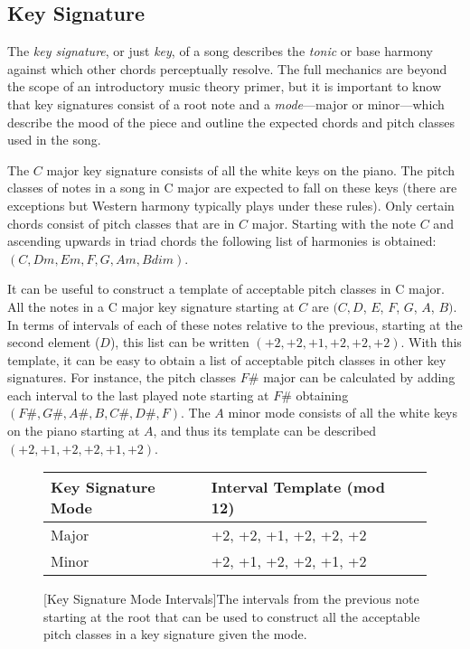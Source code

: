 \subsection{Key Signature}

The \textit{key signature}, or just \textit{key}, of a song describes the \textit{tonic} or base harmony against which other chords perceptually resolve. The full mechanics are beyond the scope of an introductory music theory primer, but it is important to know that key signatures consist of a root note and a \textit{mode}---major or minor---which describe the mood of the piece and outline the expected chords and pitch classes used in the song.

The $C$ major key signature consists of all the white keys on the piano. The pitch classes of notes in a song in C major are expected to fall on these keys (there are exceptions but Western harmony typically plays under these rules). Only certain chords consist of pitch classes that are in $C$ major. Starting with the note $C$ and ascending upwards in triad chords the following list of harmonies is obtained: $(C, Dm, Em, F, G, Am, Bdim)$.

It can be useful to construct a template of acceptable pitch classes in C major. All the notes in a C major key signature starting at $C$ are $(C, D$, $E$, $F$, $G$, $A$, $B)$. In terms of intervals of each of these notes relative to the previous, starting at the second element ($D$), this list can be written $(+2, +2, +1, +2, +2, +2)$. With this template, it can be easy to obtain a list of acceptable pitch classes in other key signatures. For instance, the pitch classes $F\#$ major can be calculated by adding each interval to the last played note starting at $F\#$ obtaining $(F\#,G\#,A\#,B,C\#,D\#,F)$. The $A$ minor mode consists of all the white keys on the piano starting at $A$, and thus its template can be described $(+2,+1,+2,+2,+1,+2)$.

\begin{figure}
\centering
\begin{tabular}{lll}
\toprule
Key Signature Mode        & Interval Template (mod 12) \\
\midrule
Major       & +2, +2, +1, +2, +2, +2 \\
Minor       & +2, +1, +2, +2, +1, +2 \\
\bottomrule
\end{tabular}
\caption{[Key Signature Mode Intervals]The intervals from the previous note starting at the root that can be used to construct all the acceptable pitch classes in a key signature given the mode.}
\end{figure}
